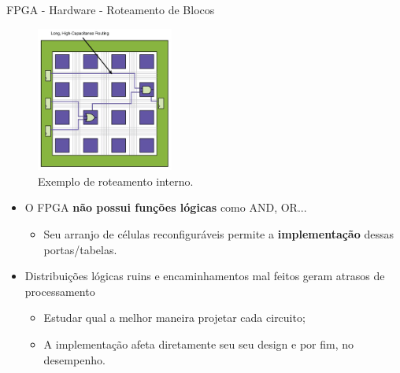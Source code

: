 \documentclass[aspectratio=169]{beamer}
\begin{document}
	
	\begin{frame}{FPGA - Hardware - Roteamento de Blocos}
		\begin{multicols}{2}
			\begin{figure}[h]
				\centering
				\includegraphics[width=0.40\textwidth]{img/fpga/exemploInicial.png}
				\caption{Exemplo de roteamento interno.}
				\label{fig:exemploInicial}
			\end{figure}
			\columnbreak
			\begin{itemize}
				\setlength\itemsep{1em}
				\item O FPGA \textbf{não possui funções lógicas} como AND, OR... 
				\begin{itemize}
					\item Seu arranjo de células reconfiguráveis permite a \textbf{implementação} dessas portas/tabelas.
				\end{itemize}
				
				\item Distribuições lógicas ruins e encaminhamentos mal feitos geram atrasos de processamento
				\begin{itemize}
					\setlength\itemsep{0.3em}
					\item Estudar qual a melhor maneira projetar cada circuito;
					
					\item A implementação afeta diretamente seu seu design e por fim, no desempenho.
				\end{itemize}
				
			\end{itemize}
		\end{multicols}
	\end{frame}
	
\end{document}

